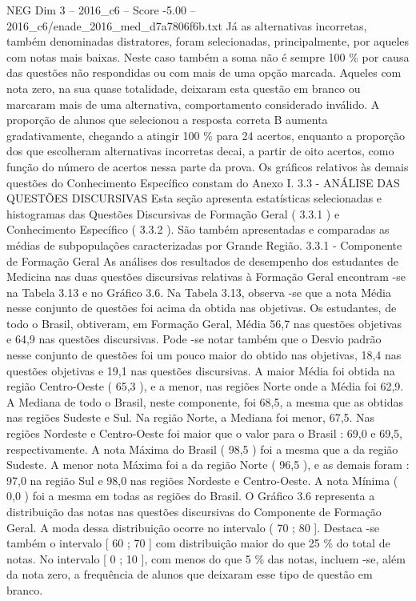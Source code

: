\begin{textsample}{NEG Dim 3 – 2016\_c6 – Score -5.00 – 2016\_c6/enade\_2016\_med\_d7a7806f6b.txt}
Já as alternativas incorretas, também denominadas distratores, foram selecionadas, principalmente, por aqueles com notas mais baixas.
Neste caso também a soma não é sempre 100 \% por causa das questões não respondidas ou com mais de uma opção marcada.
Aqueles com nota zero, na sua quase totalidade, deixaram esta questão em branco ou marcaram mais de uma alternativa, comportamento considerado inválido.
A proporção de alunos que selecionou a resposta correta B aumenta gradativamente, chegando a atingir 100 \% para 24 acertos, enquanto a proporção dos que escolheram alternativas incorretas decai, a partir de oito acertos, como função do número de acertos nessa parte da prova.
Os gráficos relativos às demais questões do Conhecimento Específico constam do Anexo I. 3.3 - ANÁLISE DAS QUESTÕES DISCURSIVAS Esta seção apresenta estatísticas selecionadas e histogramas das Questões Discursivas de Formação Geral ( 3.3.1 ) e Conhecimento Específico ( 3.3.2 ).
São também apresentadas e comparadas as médias de subpopulações caracterizadas por Grande Região. 3.3.1 - Componente de Formação Geral As análises dos resultados de desempenho dos estudantes de Medicina nas duas questões discursivas relativas à Formação Geral encontram -se na Tabela 3.13 e no Gráfico 3.6.
Na Tabela 3.13, observa -se que a nota Média nesse conjunto de questões foi acima da obtida nas objetivas.
Os estudantes, de todo o Brasil, obtiveram, em Formação Geral, Média 56,7 nas questões objetivas e 64,9 nas questões discursivas.
Pode -se notar também que o Desvio padrão nesse conjunto de questões foi um pouco maior do obtido nas objetivas, 18,4 nas questões objetivas e 19,1 nas questões discursivas.
A maior Média foi obtida na região Centro-Oeste ( 65,3 ), e a menor, nas regiões Norte onde a Média foi 62,9.
A Mediana de todo o Brasil, neste componente, foi 68,5, a mesma que as obtidas nas regiões Sudeste e Sul.
Na região Norte, a Mediana foi menor, 67,5.
Nas regiões Nordeste e Centro-Oeste foi maior que o valor para o Brasil : 69,0 e 69,5, respectivamente.
A nota Máxima do Brasil ( 98,5 ) foi a mesma que a da região Sudeste.
A menor nota Máxima foi a da região Norte ( 96,5 ), e as demais foram : 97,0 na região Sul e 98,0 nas regiões Nordeste e Centro-Oeste.
A nota Mínima ( 0,0 ) foi a mesma em todas as regiões do Brasil.
O Gráfico 3.6 representa a distribuição das notas nas questões discursivas do Componente de Formação Geral.
A moda dessa distribuição ocorre no intervalo ( 70 ; 80 ].
Destaca -se também o intervalo [ 60 ; 70 ] com distribuição maior do que 25 \% do total de notas.
No intervalo [ 0 ; 10 ], com menos do que 5 \% das notas, incluem -se, além da nota zero, a frequência de alunos que deixaram esse tipo de questão em branco.

\end{textsample}
